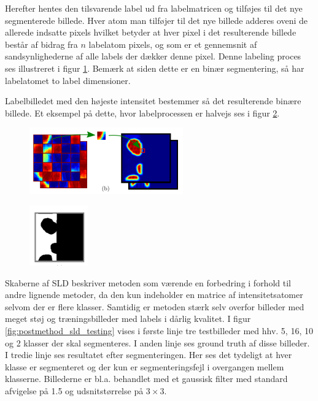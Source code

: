 Herefter hentes den tilsvarende label ud fra labelmatricen og tilføjes til det nye segmenterede billede. Hver atom man tilføjer til det nye billede adderes oveni de allerede indsatte pixels hvilket betyder at hver pixel i det resulterende billede består af bidrag fra $n$ labelatom pixels, og som er et gennemsnit af sandsynlighederne af alle labels der dækker denne pixel. Denne labeling proces ses illustreret i figur \ref{fig:postmethod_sld_labelpatch}. Bemærk at siden dette er en binær segmentering, så har labelatomet to label dimensioner.  

Labelbilledet med den højeste intensitet bestemmer så det resulterende binære billede. Et eksempel på dette, hvor labelprocessen er halvejs ses i figur \ref{fig:postmethod_sld_resulting}.

\begin{figure}[H]
		\centering
		\includegraphics[scale=1]{files/postmethod/img/dict_4.png}
	\caption{\label{fig:postmethod_sld_labelpatch}}
\end{figure}

\begin{figure}[H]
		\centering
		\includegraphics[scale=1]{files/postmethod/img/dict_5.png}
	\caption{\label{fig:postmethod_sld_resulting}}
\end{figure}

Skaberne af SLD beskriver metoden som værende en forbedring i forhold til andre lignende metoder, da den kun indeholder en matrice af intensitetsatomer selvom der er flere klasser. Samtidig er metoden stærk selv overfor billeder med meget støj og træningsbilleder med labels i dårlig kvalitet. I figur \ref{fig:postmethod_sld_testing} vises i første linje tre testbilleder med hhv. 5, 16, 10 og 2 klasser der skal segmenteres. I anden linje ses ground truth af disse billeder. I tredie linje ses resultatet efter segmenteringen. Her ses det tydeligt at hver klasse er segmenteret og der kun er segmenteringsfejl i overgangen mellem klasserne. Billederne er bl.a. behandlet med et gaussisk filter med standard afvigelse på 1.5 og udsnitstørrelse på $3\times3$.

